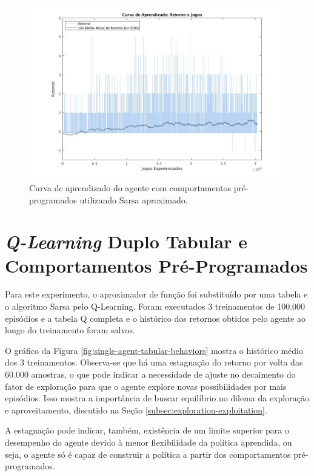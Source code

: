 \begin{figure}[H]
	\includegraphics[width=1\linewidth]{figs/curva-sarsa-1.jpg}
	\centering
	\caption{Curva de aprendizado do agente com comportamentos pré-programados utilizando Sarsa aproximado.}
	\label{fig:single-agent-sarsa-behaviors}
\end{figure}

\section{\textit{Q-Learning} Duplo Tabular e Comportamentos Pré-Programados}
\label{sec:behaviors-tabular}

Para este experimento, o aproximador de função foi substituído por uma tabela e o algoritmo Sarsa pelo Q-Learning. Foram executados 3 treinamentos de 100.000 episódios e a tabela Q completa e o histórico dos retornos obtidos pelo agente ao longo do treinamento foram salvos.

O gráfico da Figura \ref{fig:single-agent-tabular-behaviors} mostra o histórico médio dos 3 treinamentos.
Observa-se que há uma estagnação do retorno por volta das 60.000 amostras, o que pode indicar a necessidade de ajuste no decaimento do fator de exploração para que o agente explore novas possibilidades por mais episódios. Isso mostra a importância de buscar equilíbrio no dilema da exploração e aproveitamento, discutido na Seção \ref{subsec:exploration-exploitation}.

A estagnação pode indicar, também, existência de um limite superior para o desempenho do agente devido à menor flexibilidade da política aprendida, ou seja, o agente só é capaz de construir a política a partir dos comportamentos pré-programados.

